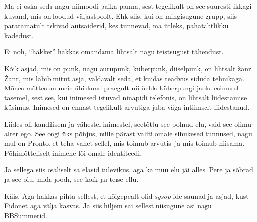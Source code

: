 
Ma ei oska seda nagu niimoodi paika panna, sest tegelikult on see suuresti ikkagi kuvand, mis on loodud väljastpoolt. Ehk siis, kui on mingisugune grupp, siis paratamatult tekivad  autsaiderid, kes tunnevad, ma ütleks, pahatahtlikku kadedust. 


Ei noh, \enquote{häkker} hakkas omandama lihtsalt nagu teistsugust tähendust.


Kõik asjad, mis on punk, nagu aurupunk, küberpunk, diiselpunk, on lihtsalt žanr. Žanr, mis läbib mitut asja, valdavalt seda, et kuidas teadvus siduda tehnikaga. Mõnes mõttes on meie ühiskond praegult nii-öelda küberpungi jaoks esimesel tasemel, sest see, kui inimesed istuvad ninapidi telefonis, on lihtsalt liidestamise küsimus. Inimesed on ennast tegelikult arvutiga juba väga intiimselt liidestanud.


Liides oli kandilisem ja vähestel inimestel, seetõttu see polnud elu, vaid see olimu alter ego. See ongi üks põhjus, mille pärast valiti omale sihukesed tunnused, nagu mul on Pronto, et teha vahet sellel, mis toimub arvutis ja mis toimub niisama. Põhimõtteliselt inimene lõi omale identiteedi. 


Ja sellega siis osaliselt sa elasid tulevikus, aga ka muu elu jäi alles. Pere ja  sõbrad ja see õlu, mida joodi, see kõik jäi teise ellu.


Käis. Aga hakkas pihta sellest, et kõigepealt olid \emph{sysop}-ide saunad ja asjad, kust Fidonet aga välja kasvas. Ja siis hiljem sai sellest niisugune asi nagu BBSummerid.
                 
                 
